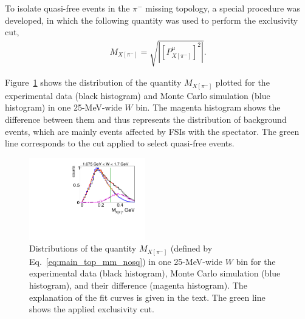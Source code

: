 \documentclass[prc,twocolumn,superscriptaddress,showpacs,amssymb,amsmath,amsfonts,aps,nofootinbib]{revtex4-1}
\begin{document}
To isolate quasi-free events in the $\pi^{-}$ missing topology, a special procedure was developed, in which the following quantity was used to perform the exclusivity cut,%
\begin{equation}
\begin{aligned}
 M_{X[\pi^{-}]}=\sqrt{|[P_{X[\pi^{-}]}^{\mu}]^{2}|}.
\end{aligned}\label{eq:main_top_mm_nosq}
\end{equation}


Figure~\ref{fig:pim_miss_top_cut} shows the distribution of the quantity $M_{X[\pi^{-}]}$ plotted for the experimental data (black histogram) and Monte Carlo simulation (blue histogram) in one 25-MeV-wide $W$ bin. The magenta histogram shows the difference between them and thus represents the distribution of background events, which are mainly events affected by FSIs with the spectator. The green line corresponds to the cut applied to select quasi-free events. %

\begin{figure}[htp]
\begin{center}
\includegraphics[width=0.45\textwidth,keepaspectratio]{pictures/event_selection/excl_cut_pim_miss2.pdf}
\vspace{-0.1cm}
\caption{Distributions of the quantity $M_{X[\pi^{-}]}$ (defined by Eq.\!~\eqref{eq:main_top_mm_nosq}) in one 25-MeV-wide $W$ bin for the experimental data (black histogram), Monte Carlo simulation (blue histogram), and their difference (magenta histogram). The explanation of the fit curves is given in the text. The green line shows the applied exclusivity cut.}
\label{fig:pim_miss_top_cut}
\end{center}
\end{figure}
\end{document}
